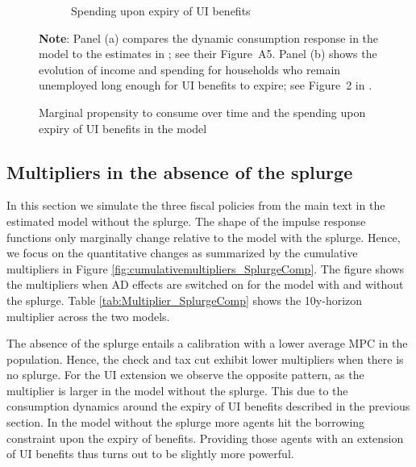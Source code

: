 \begin{figure}[thb]
\begin{subfigure}[b]{.48\linewidth}
		\caption{Spending upon expiry of UI benefits}
		\label{fig:expiryUI_wSplZero}
	\end{subfigure}%
	\caption{Marginal propensity to consume over time and the spending upon expiry of UI benefits in the model}
	\label{fig:untargetedMoments_wSplZero}
	\parbox{16cm}{\small \vspace{.15cm} \textbf{Note}: Panel (a) compares the dynamic consumption response in the model to the estimates in {\citet{fagereng_mpc_2021}}; see their Figure~A5.
Panel (b) shows the evolution of income and spending for households who remain unemployed long enough for UI benefits to expire; see Figure~2 in {\citet{ganongConsumer2019}}.\normalsize}
\end{figure}




\subsection{Multipliers in the absence of the splurge}

In this section we simulate the three fiscal policies from the main text in the estimated model without the splurge.
The shape of the impulse response functions only marginally change relative to the model with the splurge.
Hence, we focus on the quantitative changes as summarized by the cumulative multipliers in Figure \ref{fig:cumulativemultipliers_SplurgeComp}.
The figure shows the multipliers when AD effects are switched on for the model with and without the splurge.
Table \ref{tab:Multiplier_SplurgeComp} shows the 10y-horizon multiplier across the two models.

The absence of the splurge entails a calibration with a lower average MPC in the population.
Hence, the check and tax cut exhibit lower multipliers when there is no splurge.
For the UI extension we observe the opposite pattern, as the multiplier is larger in the model without the splurge.
This due to the consumption dynamics around the expiry of UI benefits described in the previous section.
In the model without the splurge more agents hit the borrowing constraint upon the expiry of benefits.
Providing those agents with an extension of UI benefits thus turns out to be slightly more powerful.


